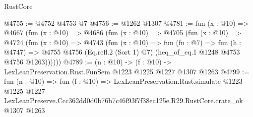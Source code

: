 \begin{lexlean}{RustCore}
\begin{coremodule}
@4755 := @4752 @4753 @7
@4756 := @1262 @1307
@4781 := fun (x : @10) =>
  @4667
    (fun (x : @10) =>
    @4686
      (fun (x : @10) =>
      @4705
        (fun (x : @10) =>
        @4724
          (fun (x : @10) =>
          @4743
            (fun (x : @10) =>
            fun (fn : @7) =>
            fun (h : @4747) =>
            @4755 @4756 (Eq.refl.{2} (Sort 1) @7) (heq_of_eq.{1} @1248 @4753 @4756 @1263))))))
@4789 := (n : @10) -> (f : @10) -> LexLeanPreservation.Rust.FunSem @1223 @1225 @1227 @1307 @1263
@4799 := fun (n : @10) =>
  fun (f : @10) =>
  LexLeanPreservation.Rust.simulate
    @1223
    @1225
    @1227
    LexLeanPreserve.Ccc362dd0d0b76b7c46f93f7f38ec125e.R29.RustCore.crate_ok
    @1307
    @1263
\end{coremodule}
\end{lexlean}
